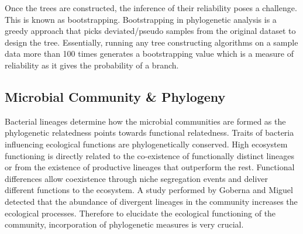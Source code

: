 Once the trees are constructed, the inference of their reliability poses a challenge. This is known as bootstrapping. Bootstrapping in phylogenetic analysis is a greedy approach that picks deviated/pseudo samples from the original dataset to design the tree. Essentially, running any tree constructing algorithms on a sample data more than 100 times generates a bootstrapping value which is a measure of reliability as it gives the probability of a branch. 

\subsection{Microbial Community \& Phylogeny}

Bacterial lineages determine how the microbial communities are formed as the phylogenetic relatedness points towards functional relatedness. Traits of bacteria influencing ecological functions are phylogenetically conserved. High ecosystem functioning is directly related to the co-existence of functionally distinct lineages or from the existence of productive lineages that outperform the rest. Functional differences allow coexistence through niche segregation events and deliver different functions to the ecosystem. A study performed by Goberna and Miguel detected that the abundance of divergent lineages in the community increases the ecological processes. Therefore to elucidate the ecological functioning of the community, incorporation of phylogenetic measures is very crucial.